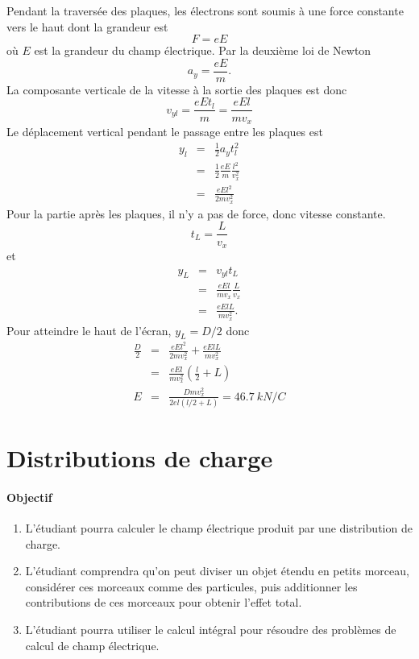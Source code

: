   Pendant la traversée des plaques, les électrons sont soumis à une force
  constante vers le haut dont la grandeur est
  \[
    F = eE
  \]
  où $E$ est la grandeur du champ électrique. Par la deuxième loi de Newton
  \[
    a_y = \frac{eE}{m}.
  \]
  La composante verticale de la vitesse à la sortie des plaques est donc
  \[
    v_{yl} = \frac{eE t_l}{m} = \frac{eEl}{mv_x}
  \]
  Le déplacement vertical pendant le passage entre les plaques est
  \begin{eqnarray*}
    y_l &=& \frac{1}{2} a_y t_l^2 \\
    &=& \frac{1}{2} \frac{eE}{m} \frac{l^2}{v_x^2} \\
    &=& \frac{eEl^2}{2mv_x^2}
  \end{eqnarray*}
  Pour la partie après les plaques, il n'y a pas de force, donc vitesse
  constante.
  \[
    t_L = \frac{L}{v_x}
  \]
  et
  \begin{eqnarray*}
    y_L &=& v_{yl} t_L \\
    &=& \frac{eEl}{mv_x}\frac{L}{v_x} \\
    &=& \frac{eElL}{mv_x^2}.
  \end{eqnarray*}
  Pour atteindre le haut de l'écran, $y_L = D/2$ donc
  \begin{eqnarray*}
    \frac{D}{2} &=& \frac{eEl^2}{2mv_x^2} + \frac{eElL}{mv_x^2} \\
     &=& \frac{eEl}{mv_x^2} \left(\frac{l}{2} + L\right) \\
    E &=& \frac{Dmv_x^2}{2el (l/2 + L)} = \SI{46.7}{kN/C}
  \end{eqnarray*}


\sectionline


\section{Distributions de charge}


\paragraph{Objectif}

\begin{enumerate}
  \item L'étudiant pourra calculer le champ électrique produit par une
    distribution de charge.
  \item L'étudiant comprendra qu'on peut diviser un objet étendu en petits
    morceau, considérer ces morceaux comme des particules, puis additionner les
    contributions de ces morceaux pour obtenir l'effet total.
  \item L'étudiant pourra utiliser le calcul intégral pour résoudre des
    problèmes de calcul de champ électrique.
\end{enumerate}


